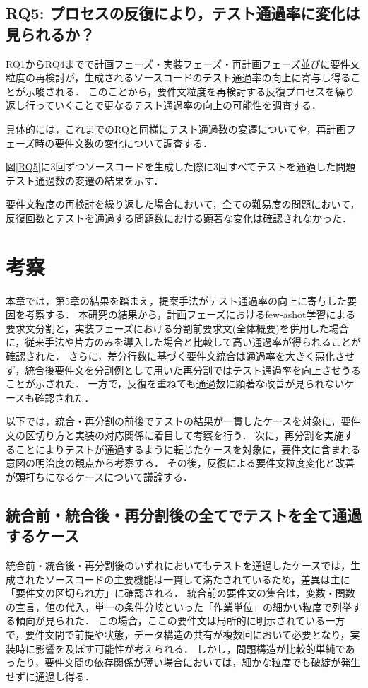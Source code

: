 \documentclass[11pt]{jreport}
\begin{document}
\section{RQ5: プロセスの反復により，テスト通過率に変化は見られるか？}
RQ1からRQ4までで計画フェーズ・実装フェーズ・再計画フェーズ並びに要件文粒度の再検討が，生成されるソースコードのテスト通過率の向上に寄与し得ることが示唆される．
このことから，要件文粒度を再検討する反復プロセスを繰り返し行っていくことで更なるテスト通過率の向上の可能性を調査する．

具体的には，これまでのRQと同様にテスト通過数の変遷についてや，再計画フェーズ時の要件文数の変化について調査する．

図\ref{RQ5}に3回ずつソースコードを生成した際に3回すべてテストを通過した問題テスト通過数の変遷の結果を示す．




要件文粒度の再検討を繰り返した場合において，全ての難易度の問題において，反復回数とテストを通過する問題数における顕著な変化は確認されなかった．


\chapter{考察}
本章では，第5章の結果を踏まえ，提案手法がテスト通過率の向上に寄与した要因を考察する．
本研究の結果から，計画フェーズにおけるfew-ashot学習による要求文分割と，実装フェーズにおける分割前要求文(全体概要)を併用した場合に，従来手法や片方のみを導入した場合と比較して高い通過率が得られることが確認された．
さらに，差分行数に基づく要件文統合は通過率を大きく悪化させず，統合後要件文を分割例として用いた再分割ではテスト通過率を向上させうることが示された．
一方で，反復を重ねても通過数に顕著な改善が見られないケースも確認された．

以下では，統合・再分割の前後でテストの結果が一貫したケースを対象に，要件文の区切り方と実装の対応関係に着目して考察を行う．
次に，再分割を実施することによりテストが通過するように転じたケースを対象に，要件文に含まれる意図の明治度の観点から考察する．
その後，反復による要件文粒度変化と改善が頭打ちになるケースについて議論する．


\section{統合前・統合後・再分割後の全てでテストを全て通過するケース}
統合前・統合後・再分割後のいずれにおいてもテストを通過したケースでは，生成されたソースコードの主要機能は一貫して満たされているため，差異は主に「要件文の区切られ方」に確認される．
統合前の要件文の集合は，変数・関数の宣言，値の代入，単一の条件分岐といった「作業単位」の細かい粒度で列挙する傾向が見られた．
この場合，ここの要件文は局所的に明示されている一方で，要件文間で前提や状態，データ構造の共有が複数回において必要となり，実装時に影響を及ぼす可能性が考えられる．
しかし，問題構造が比較的単純であったり，要件文間の依存関係が薄い場合においては，細かな粒度でも破綻が発生せずに通過し得る．
\end{document}
